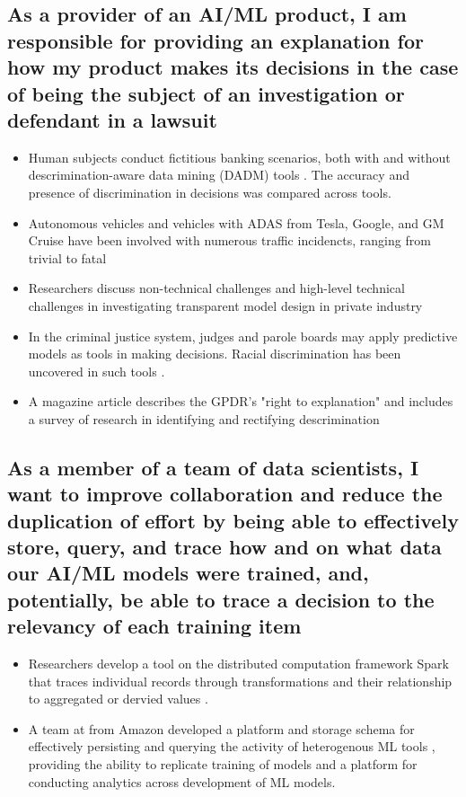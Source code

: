 \documentclass{IEEEtran}
\begin{document}
\subsection{As a provider of an AI/ML product, I am responsible for providing an explanation for how my product makes its decisions in the case of being the subject of an investigation or defendant in a lawsuit}

\begin{itemize}
    \item Human subjects conduct fictitious banking scenarios, both with and without descrimination-aware data mining (DADM) tools \cite{Berendt2014}.  The accuracy and presence of discrimination in decisions was compared across tools.
    \item Autonomous vehicles and vehicles with ADAS from Tesla, Google, and GM Cruise have been involved with numerous traffic incidencts, ranging from trivial to fatal \cite{Read2016} \cite{Tesla2018} \cite{Ackerman2016} \cite{Bhavsar2017} 
    \item Researchers discuss non-technical challenges and high-level technical challenges in investigating transparent model design in private industry \cite{Veale:2018:FAD:3173574.3174014}
    \item In the criminal justice system, judges and parole boards may apply predictive models as tools in making decisions.  Racial discrimination has been uncovered in such tools \cite{Wexler.2017} \cite{Angwin2016}.
    \item A magazine article describes the GPDR's "right to explanation" and includes a survey of research in identifying and rectifying descrimination \cite{Goodman2017EuropeanUR}
\end{itemize}

\subsection{As a member of a team of data scientists, I want to improve collaboration and reduce the duplication of effort by being able to effectively store, query, and trace how and on what data our  AI/ML models were trained, and, potentially, be able to trace a decision to the relevancy of each training item}

\begin{itemize}
    \item Researchers develop a tool on the distributed computation framework Spark that traces individual records through transformations and their relationship to aggregated or dervied values  \cite{Interlandi2017}.
    \item A team at from Amazon developed a platform and storage schema for effectively persisting and querying the activity of heterogenous ML tools \cite{Schelter2017}, providing the ability to replicate training of models and a platform for conducting analytics across development of ML models.
\end{itemize}
\end{document}
